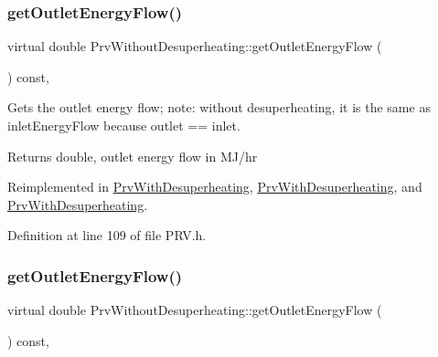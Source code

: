 \subsubsection{\texorpdfstring{get\+Outlet\+Energy\+Flow()}{getOutletEnergyFlow()}\hspace{0.1cm}{\footnotesize\ttfamily [2/3]}}
{\footnotesize\ttfamily virtual double Prv\+Without\+Desuperheating\+::get\+Outlet\+Energy\+Flow (\begin{DoxyParamCaption}{ }\end{DoxyParamCaption}) const\hspace{0.3cm}{\ttfamily [inline]}, {\ttfamily [virtual]}}

Gets the outlet energy flow; note\+: without desuperheating, it is the same as inlet\+Energy\+Flow because outlet == inlet. \begin{DoxyReturn}{Returns}
double, outlet energy flow in M\+J/hr 
\end{DoxyReturn}


Reimplemented in \hyperlink{class_prv_with_desuperheating_a2394fb62e4fc85252fc4eb15f08e9f1e}{Prv\+With\+Desuperheating}, \hyperlink{class_prv_with_desuperheating_a2394fb62e4fc85252fc4eb15f08e9f1e}{Prv\+With\+Desuperheating}, and \hyperlink{class_prv_with_desuperheating_a2394fb62e4fc85252fc4eb15f08e9f1e}{Prv\+With\+Desuperheating}.



Definition at line 109 of file P\+R\+V.\+h.

\mbox{\label{class_prv_without_desuperheating_a6529a68ffa444ae87c890b2bcbc2cc84}} 
\subsubsection{\texorpdfstring{get\+Outlet\+Energy\+Flow()}{getOutletEnergyFlow()}\hspace{0.1cm}{\footnotesize\ttfamily [3/3]}}
{\footnotesize\ttfamily virtual double Prv\+Without\+Desuperheating\+::get\+Outlet\+Energy\+Flow (\begin{DoxyParamCaption}{ }\end{DoxyParamCaption}) const\hspace{0.3cm}{\ttfamily [inline]}, {\ttfamily [virtual]}}

